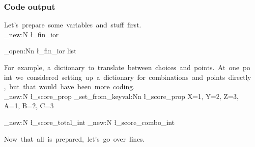\documentclass[]{article}
\begin{document}
      \subsubsection{Code output}

        \ExplSyntaxOn

        Let's~prepare~some~variables~and~stuff~first.\newline\\

          \ior_new:N \l_fin_ior

          \ior_open:Nn \l_fin_ior {list}

          For~example,~a~dictionary~to~translate~between~choices~and~points.~At~one~point~we~considered~setting~up~a~dictionary~for~combinations~and~points~directly,~but~that~would~have~been~more~coding.\newline\\

          \prop_new:N \l_score_prop
          \prop_set_from_keyval:Nn \l_score_prop
          {
            X=1,
            Y=2,
            Z=3,
            A=1,
            B=2,
            C=3
          }

          \int_new:N \l_score_total_int
          \int_new:N \l_score_combo_int

        Now~that~all~is~prepared,~let's~go~over~lines.\newline\\
\end{document}
